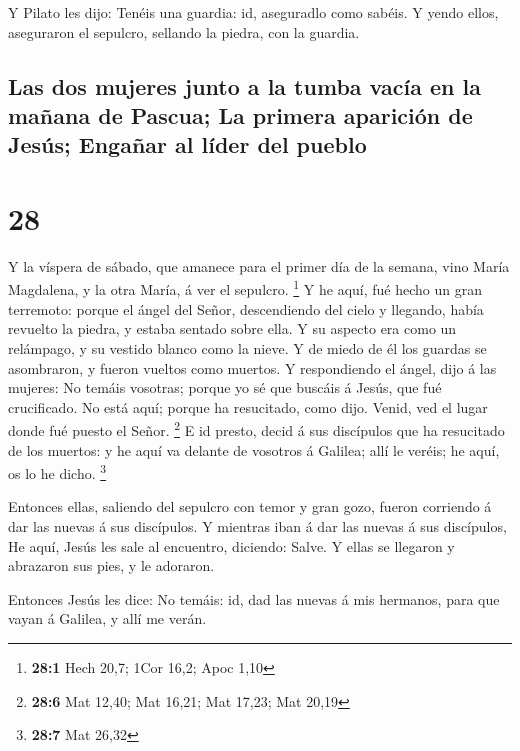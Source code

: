  Y Pilato les dijo: Tenéis una guardia: id, aseguradlo
como sabéis.  Y yendo ellos, aseguraron el sepulcro,
sellando la piedra, con la guardia.

\hypertarget{las-dos-mujeres-junto-a-la-tumba-vacuxeda-en-la-mauxf1ana-de-pascua-la-primera-apariciuxf3n-de-jesuxfas-engauxf1ar-al-luxedder-del-pueblo}{%
\subsection{Las dos mujeres junto a la tumba vacía en la mañana de
Pascua; La primera aparición de Jesús; Engañar al líder del
pueblo}\label{las-dos-mujeres-junto-a-la-tumba-vacuxeda-en-la-mauxf1ana-de-pascua-la-primera-apariciuxf3n-de-jesuxfas-engauxf1ar-al-luxedder-del-pueblo}}

\hypertarget{section-27}{%
\section{28}\label{section-27}}

 Y la víspera de sábado, que amanece para el primer día de
la semana, vino María Magdalena, y la otra María, á ver el sepulcro.
\footnote{\textbf{28:1} Hech 20,7; 1Cor 16,2; Apoc 1,10} 
Y he aquí, fué hecho un gran terremoto: porque el ángel del Señor,
descendiendo del cielo y llegando, había revuelto la piedra, y estaba
sentado sobre ella.  Y su aspecto era como un relámpago, y
su vestido blanco como la nieve.  Y de miedo de él los
guardas se asombraron, y fueron vueltos como muertos.  Y
respondiendo el ángel, dijo á las mujeres: No temáis vosotras; porque yo
sé que buscáis á Jesús, que fué crucificado.  No está
aquí; porque ha resucitado, como dijo. Venid, ved el lugar donde fué
puesto el Señor. \footnote{\textbf{28:6} Mat 12,40; Mat 16,21; Mat
  17,23; Mat 20,19}  E id presto, decid á sus discípulos
que ha resucitado de los muertos: y he aquí va delante de vosotros á
Galilea; allí le veréis; he aquí, os lo he dicho. \footnote{\textbf{28:7}
  Mat 26,32}

 Entonces ellas, saliendo del sepulcro con temor y gran
gozo, fueron corriendo á dar las nuevas á sus discípulos. Y mientras
iban á dar las nuevas á sus discípulos,  He aquí, Jesús
les sale al encuentro, diciendo: Salve. Y ellas se llegaron y abrazaron
sus pies, y le adoraron.

 Entonces Jesús les dice: No temáis: id, dad las nuevas á
mis hermanos, para que vayan á Galilea, y allí me verán.

